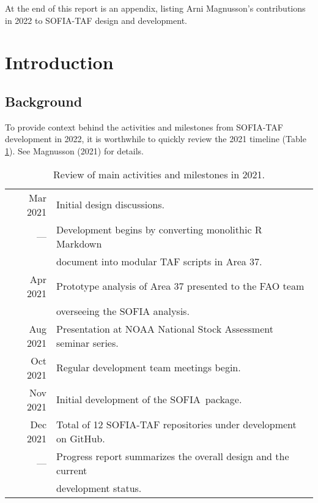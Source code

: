 \documentclass[12pt]{article}
\newcommand\I[1]{\rule{0pt}{#1}}
\newcommand\SOFIA{{\sf SOFIA}}
\begin{document}
At the end of this report is an appendix, listing Arni Magnusson's contributions
in 2022 to SOFIA-TAF design and development.


\section{Introduction}

\subsection{Background}

To provide context behind the activities and milestones from SOFIA-TAF
development in 2022, it is worthwhile to quickly review the 2021 timeline (Table
\ref{tab:timeline-2021}). See Magnusson (2021) for details.

\begin{table}[htb]\small
  \caption{Review of main activities and milestones in 2021.}
  \centering
  \begin{tabular}{rl}
    \hline
    Mar 2021 & Initial design discussions.\I{2.3ex}\\[0.8ex]
    ---      & Development begins by converting monolithic R Markdown\\
    ~        & document into modular TAF scripts in Area 37.\\[0.8ex]
    Apr 2021 & Prototype analysis of Area 37 presented to the FAO team\\
    ~        & overseeing the SOFIA analysis.\\[0.8ex]
    Aug 2021 & Presentation at NOAA National Stock Assessment seminar
               series.\\[0.8ex]
    Oct 2021 & Regular development team meetings begin.\\[0.8ex]
    Nov 2021 & Initial development of the \SOFIA\ package.\\[0.8ex]
    Dec 2021 & Total of 12 SOFIA-TAF repositories under development on
               GitHub.\\[0.8ex]
    ---      & Progress report summarizes the overall design and the current\\
    ~        & development status.\\
    \hline
  \end{tabular}
  \label{tab:timeline-2021}
  \vspace{1.5ex}
\end{table}
\end{document}
